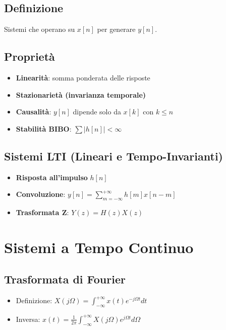 \subsection*{Definizione}

Sistemi che operano su $x[n]$ per generare $y[n]$.

\subsection*{Proprietà}
\begin{itemize}
    \item \textbf{Linearità}: somma ponderata delle risposte
    \item \textbf{Stazionarietà (invarianza temporale)}
    \item \textbf{Causalità}: $y[n]$ dipende solo da $x[k]$ con $k\leq n$
    \item \textbf{Stabilità BIBO}: $\sum |h[n]| < \infty$
\end{itemize}

\subsection*{Sistemi LTI (Lineari e Tempo-Invarianti)}

\begin{itemize}
    \item \textbf{Risposta all'impulso} $h[n]$
    \item \textbf{Convoluzione}: $y[n] = \sum\limits_{m=-\infty}^{+\infty} h[m]x[n-m]$
    \item \textbf{Trasformata Z}: $Y(z)=H(z)X(z)$
\end{itemize}

\section{Sistemi a Tempo Continuo}

\subsection*{Trasformata di Fourier}
\begin{itemize}
    \item Definizione: $X(j\Omega)=\int_{-\infty}^{+\infty} x(t)e^{-j\Omega t} dt$
    \item Inversa: $x(t)=\frac{1}{2\pi} \int_{-\infty}^{+\infty} X(j\Omega)e^{j\Omega t} d\Omega$
\end{itemize}

